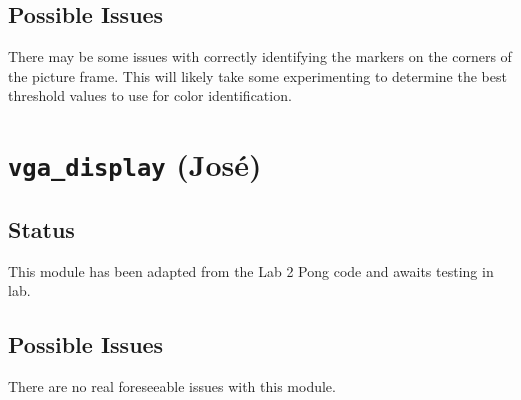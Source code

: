 \documentclass{article}
\begin{document}
\subsection{Possible Issues} There may be some issues with correctly identifying the markers on the corners of the picture frame. This will likely take some experimenting to determine the best threshold values to use for color identification.

\section{{\tt vga\_display} (Jos\'{e})}
\subsection{Status} This module has been adapted from the Lab 2 Pong code and awaits testing in lab.
\subsection{Possible Issues} There are no real foreseeable issues with this module.
\end{document}
